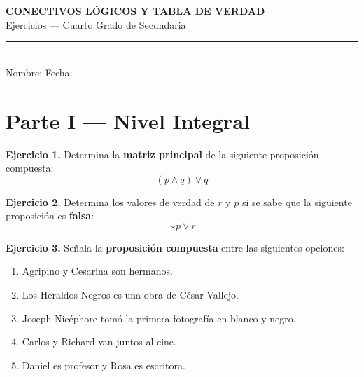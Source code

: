 \documentclass[12pt,a4paper]{article}
\newcommand{\espacioresp}[1][3cm]{\vspace{#1}}
\begin{document}
\begin{center}
  {\LARGE\bfseries\color{primario} CONECTIVOS LÓGICOS Y TABLA DE VERDAD}\\[4pt]
  {\large Ejercicios — Cuarto Grado de Secundaria}\\[2pt]
  \textcolor{gray}{\rule{0.6\linewidth}{0.6pt}}\\[6pt]
  Nombre: \underline{\hspace{7cm}} \quad Fecha: \underline{\hspace{3cm}}
\end{center}

\vspace{6pt}

\section{Parte I — Nivel Integral}

\begin{ejerciciobox}
\textbf{Ejercicio 1.}
Determina la \textbf{matriz principal} de la siguiente proposición compuesta:
\[
(p \wedge q) \vee q
\]
\end{ejerciciobox}

\espacioresp[5cm]

\begin{ejerciciobox}
\textbf{Ejercicio 2.}
Determina los valores de verdad de $r$ y $p$ si se sabe que la siguiente
proposición es \textbf{falsa}:
\[
\sim p \vee r
\]
\end{ejerciciobox}

\espacioresp[3.5cm]

\begin{ejerciciobox}
\textbf{Ejercicio 3.}
Señala la \textbf{proposición compuesta} entre las siguientes opciones:

\begin{enumerate}[label=\alph*)]
  \item Agripino y Cesarina son hermanos.
  \item Los Heraldos Negros es una obra de César Vallejo.
  \item Joseph-Nicéphore tomó la primera fotografía en blanco y negro.
  \item Carlos y Richard van juntos al cine.
  \item Daniel es profesor y Rosa es escritora.
\end{enumerate}
\end{ejerciciobox}
\end{document}

